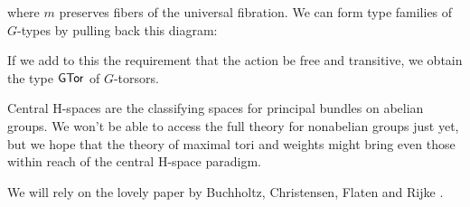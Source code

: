 \begin{center}
\end{center}

where \( m \) preserves fibers of the universal fibration. We can form type families of \( G \)-types by pulling back this diagram:

\begin{center}
\end{center}

If we add to this the requirement that the action be free and transitive, we obtain the type \( \mathsf{GTor} \) of \( G \)-torsors.

Central H-spaces are the classifying spaces for principal bundles on abelian groups. We won't be able to access the full theory for nonabelian groups just yet, but we hope that the theory of maximal tori and weights might bring even those within reach of the central H-space paradigm.

We will rely on the lovely paper by Buchholtz, Christensen, Flaten and Rijke \cite{buchholtz2023central}. 

